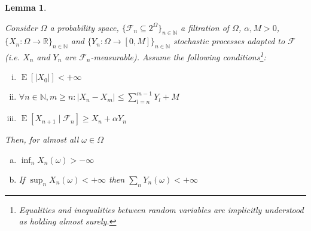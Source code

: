 \documentclass[11pt]{article}
\theoremstyle{definition}
\theoremstyle{plain}
\newtheorem{lemma}{Lemma}%
\newcommand{\Nats}{\mathbb{N}}
\newcommand{\Reals}{\mathbb{R}}
\newcommand{\A}[1]{\lvert #1 \rvert}
\newcommand{\Sq}[2]{\{#1\}_{#2 \in \Nats}}
\newcommand{\Sqn}[1]{\Sq{#1}{n}}
\DeclareMathOperator{\E}{E}
\newcommand{\F}{\mathcal{F}}
\begin{document}
\begin{samepage}
\begin{lemma}
\label{lmm:prudent}

Consider $\Omega$ a probability space, $\Sqn{\F_n \subseteq 2^\Omega}$ a filtration of $\Omega$, $\alpha,M > 0$, $\Sqn{X_n: \Omega \rightarrow \Reals}$ and $\Sqn{Y_n: \Omega \rightarrow \left[0,M\right]}$ stochastic processes adapted to $\F$ (i.e. $X_n$ and $Y_n$ are $\F_n$-measurable). Assume the following conditions\footnote{Equalities and inequalities between random variables are implicitly understood as holding almost surely.}:

\begin{enumerate}[i.]

\item $\E\left[\A{X_0}\right] < +\infty$
\item $\forall n \in \Nats, m \geq n: \A{X_n - X_m} \leq \sum_{l=n}^{m-1} Y_l + M$
\item $\E\left[X_{n+1} \mid \F_n\right] \geq X_n + \alpha Y_n$

\end{enumerate}

Then, for almost all $\omega \in \Omega$

\begin{enumerate}[a.]

\item\label{itm:lmm_prudent__inf} $\inf_n X_n\left(\omega\right) > -\infty$
\item\label{itm:lmm_prudent__sup} If $\sup_n X_n\left(\omega\right) < +\infty$ then $\sum_n Y_n\left(\omega\right) < +\infty$

\end{enumerate}

\end{lemma}
\end{samepage}
\end{document}

